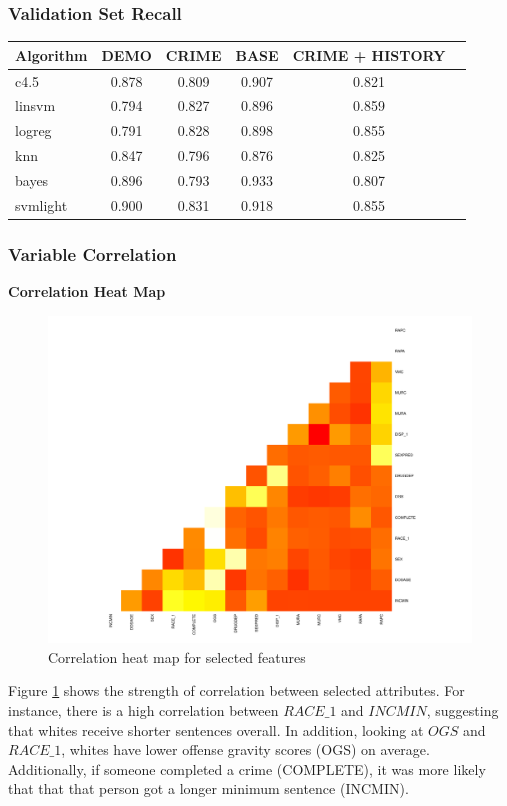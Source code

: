 \documentclass[11pt,letter]{article}
\begin{document}
\subsubsection{Validation Set Recall}

\begin{tabular}{|l|c|c|c|c|c|}
\hline
Algorithm & DEMO & CRIME & BASE & CRIME + HISTORY\\
\hline
c4.5     & 0.878 & 0.809 & 0.907 & 0.821 \\
linsvm   & 0.794 & 0.827 & 0.896 & 0.859 \\
logreg   & 0.791 & 0.828 & 0.898 & 0.855 \\
knn   & 0.847 & 0.796 & 0.876 & 0.825 \\
bayes    & 0.896 & 0.793 & 0.933 & 0.807 \\
svmlight & 0.900 & 0.831 & 0.918 & 0.855 \\
\hline
\end{tabular}

\subsubsection{Variable Correlation}

\textbf{Correlation Heat Map}
\begin{figure}
	\centering
	\includegraphics[scale=0.35]{report_figures/cool.pdf}
	\caption{Correlation heat map for selected features}
	\label{corr_heat_map}
\end{figure}
Figure \ref{corr_heat_map} shows the strength of correlation between selected attributes. For instance, there is a high correlation between $RACE\_1$ and $INCMIN$, suggesting that whites receive shorter sentences overall. In addition, looking at $OGS$ and $RACE\_1$, whites have lower offense gravity scores (OGS) on average. Additionally, if someone completed a crime (COMPLETE), it was more likely that that that person got a longer minimum sentence (INCMIN).
\end{document}
